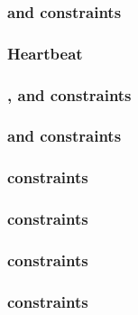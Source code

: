 \subsubsection{\ct{} and \maxCt{} constraints}                                                  \label{rom: generalities: ct and ct max constraints}    
\subsubsection{Heartbeat}                                                                       \label{rom: generalities: heartbeat}                           
\subsubsection{\romColumnLimb{}, \romColumnLimbAcc{} and \romColumnLimbByte{} constraints}      \label{rom: generalities: limb byte accumulation}              
\subsubsection{\romColumnLimbByteSize{} and \romColumnLimbByteSizeAcc{}       constraints}      \label{rom: generalities: limb size accumulation}              
\subsubsection{\romColumnProgramCounter{} constraints}                                          \label{rom: generalities: program counter}              
\subsubsection{\romColumnPadding{} constraints}                                                 \label{rom: generalities: code size reached}            
\subsubsection{\romColumnLimbByteSize{} constraints}                                            \label{rom: generalities: nBytes}                       
\subsubsection{\romColumnLimbIndex{} constraints}                                               \label{rom: generalities: index}                        
